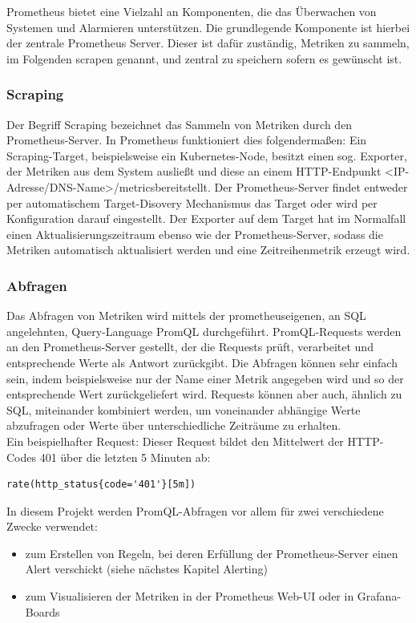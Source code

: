 \documentclass[a4paper,10pt]{scrartcl}
\begin{document}
Prometheus bietet eine Vielzahl an Komponenten, die das Überwachen von Systemen und Alarmieren unterstützen. Die grundlegende Komponente ist hierbei der zentrale Prometheus Server. Dieser ist dafür zuständig, Metriken zu sammeln, im Folgenden scrapen genannt, und zentral zu speichern sofern es gewünscht ist.

\subsubsection{Scraping}

Der Begriff Scraping bezeichnet das Sammeln von Metriken durch den Prometheus-Server. In Prometheus funktioniert dies folgendermaßen:
Ein Scraping-Target, beispielsweise ein Kubernetes-Node, besitzt einen sog. Exporter, der Metriken aus dem System ausließt und diese an einem HTTP-Endpunkt \glqq<IP-Adresse/DNS-Name>/metrics\grqq bereitstellt. Der Prometheus-Server findet entweder per automatischem Target-Disovery Mechanismus das Target oder wird per Konfiguration darauf eingestellt.
Der Exporter auf dem Target hat im Normalfall einen Aktualisierungszeitraum ebenso wie der Prometheus-Server, sodass die Metriken automatisch aktualisiert werden und eine Zeitreihenmetrik erzeugt wird.

\subsubsection{Abfragen}

Das Abfragen von Metriken wird mittels der prometheuseigenen, an SQL angelehnten, Query-Language PromQL durchgeführt. PromQL-Requests werden an den Prometheus-Server gestellt, der die Requests prüft, verarbeitet und entsprechende Werte als Antwort zurückgibt. Die Abfragen können sehr einfach sein, indem beispielsweise nur der Name einer Metrik angegeben wird und so der entsprechende Wert zurückgeliefert wird. Requests können aber auch, ähnlich zu SQL, miteinander kombiniert werden, um voneinander abhängige Werte abzufragen oder Werte über unterschiedliche Zeiträume zu erhalten.\\

Ein beispielhafter Request:
Dieser Request bildet den Mittelwert der HTTP-Codes 401 über die letzten 5 Minuten ab:
\begin{lstlisting}
rate(http_status{code='401'}[5m])
\end{lstlisting}

In diesem Projekt werden PromQL-Abfragen vor allem für zwei verschiedene Zwecke verwendet:
\begin{itemize}
\item zum Erstellen von Regeln, bei deren Erfüllung der Prometheus-Server einen Alert verschickt (siehe nächstes Kapitel Alerting)
\item zum Visualisieren der Metriken in der Prometheus Web-UI oder in Grafana-Boards
\end{itemize}
\end{document}
